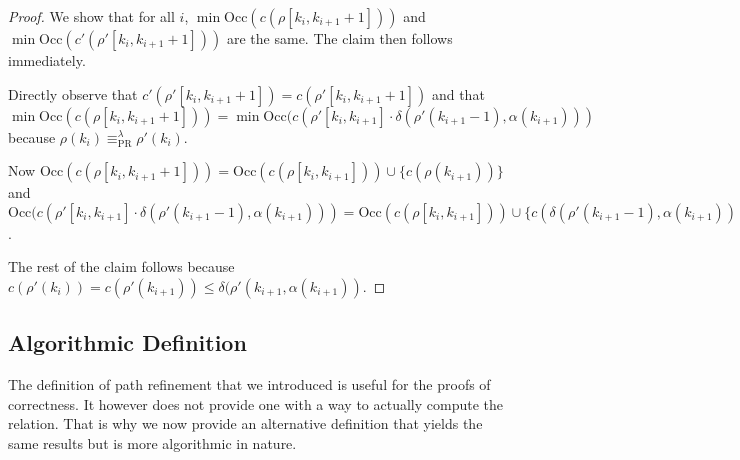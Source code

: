 \begin{proof}
	We show that for all $i$, $\min \text{Occ}(c(\rho[k_i, k_{i+1}+1]))$ and $\min \text{Occ}(c'(\rho'[k_i, k_{i+1}+1]))$ are the same. The claim then follows immediately. 
	
	Directly observe that $c'(\rho'[k_i, k_{i+1}+1]) = c(\rho'[k_i, k_{i+1}+1])$ and that $\min \text{Occ}(c(\rho[k_i, k_{i+1}+1])) = \min \text{Occ}(c(\rho'[k_i, k_{i+1}] \cdot \delta(\rho'(k_{i+1} - 1), \alpha(k_{i+1})))$ because $\rho(k_i) \equiv_\text{PR}^\lambda \rho'(k_i)$.
	
	Now $\text{Occ}(c(\rho[k_i, k_{i+1}+1])) = \text{Occ}(c(\rho[k_i, k_{i+1}])) \cup \{c(\rho(k_{i+1}))\}$ and $\text{Occ}(c(\rho'[k_i, k_{i+1}] \cdot \delta(\rho'(k_{i+1} - 1), \alpha(k_{i+1}))) = \text{Occ}(c(\rho[k_i, k_{i+1}])) \cup \{c(\delta(\rho'(k_{i+1} - 1), \alpha(k_{i+1})))\}$.
	
	The rest of the claim follows because $c(\rho'(k_i)) = c(\rho'(k_{i+1})) \leq \delta(\rho'(k_{i+1}, \alpha(k_{i+1}))$.
\end{proof}


\subsection{Algorithmic Definition}
The definition of path refinement that we introduced is useful for the proofs of correctness. It however does not provide one with a way to actually compute the relation. That is why we now provide an alternative definition that yields the same results but is more algorithmic in nature.

